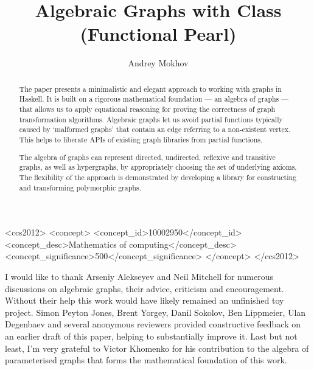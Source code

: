 \documentclass[sigplan,screen,authorversion,9pt]{acmart}
\begin{document}
\title{Algebraic Graphs with Class (Functional Pearl)}

\author{Andrey Mokhov}

\begin{abstract}
The paper presents a minimalistic and elegant approach to working
with graphs in Haskell. It is built on a rigorous
mathematical foundation --- an algebra of graphs --- that allows us to apply
equational reasoning for proving the correctness of graph transformation
algorithms. Algebraic graphs let us avoid partial functions typically
caused by `malformed graphs' that contain an edge referring to
a non-existent vertex. This helps to liberate APIs of existing graph libraries
from partial functions.

The algebra of graphs can represent directed, undirected, reflexive
and transitive graphs, as well as hypergraphs, by appropriately choosing
the set of underlying axioms. The flexibility of the approach is
demonstrated by developing a library for constructing
and transforming polymorphic graphs.%
\end{abstract}

\begin{CCSXML}
<ccs2012>
<concept>
<concept_id>10002950</concept_id>
<concept_desc>Mathematics of computing</concept_desc>
<concept_significance>500</concept_significance>
</concept>
</ccs2012>
\end{CCSXML}


\maketitle









\begin{acks}
  I would like to thank Arseniy Alekseyev and Neil Mitchell
  for numerous discussions on algebraic graphs, their advice,
  criticism and encouragement. Without their help this work would
  have likely remained an unfinished toy project.
  Simon Peyton Jones, Brent Yorgey, Danil Sokolov, Ben Lippmeier, Ulan Degenbaev
  and several anonymous reviewers provided constructive feedback on an
  earlier draft of this paper, helping to substantially improve it. Last but
  not least, I'm very grateful to Victor Khomenko for his contribution to the
  algebra of parameterised graphs that forms the mathematical foundation of this work.
\end{acks}


\end{document}
